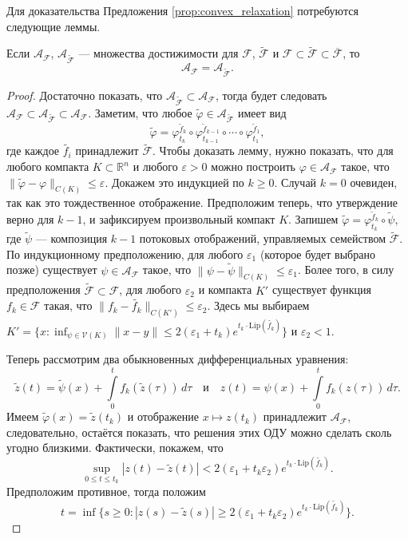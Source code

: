 \documentclass[../NDCNNAI_main.tex]{subfiles}
\begin{document}
Для доказательства Предложения \ref{prop:convex_relaxation} потребуются следующие леммы.

\begin{lemma}\label{lemma:3.12}
Если \(\mathcal{A}_{\mathcal{F}}\), \(\mathcal{A}_{\tilde{\mathcal{F}}}\) --- множества достижимости для \(\mathcal{F}\), \(\tilde{\mathcal{F}}\) и \(\mathcal{F} \subset \tilde{\mathcal{F}} \subset \overline{\mathcal{F}}\), то
\[
\mathcal{A}_{\mathcal{F}} = \mathcal{A}_{\tilde{\mathcal{F}}}.
\]
\end{lemma}

\begin{proof}
Достаточно показать, что \(\mathcal{A}_{\tilde{\mathcal{F}}} \subset \mathcal{A}_{\mathcal{F}}\), тогда будет следовать \(\mathcal{A}_{\mathcal{F}} \subset \mathcal{A}_{\tilde{\mathcal{F}}} \subset \mathcal{A}_{\mathcal{F}}\). Заметим, что любое \(\tilde{\varphi} \in \mathcal{A}_{\tilde{\mathcal{F}}}\) имеет вид
\[
\tilde{\varphi} = \varphi_{t_k}^{\tilde{f}_k} \circ \varphi_{t_{k-1}}^{\tilde{f}_{k-1}} \circ \cdots \circ \varphi_{t_1}^{\tilde{f}_1},
\]
где каждое \(\tilde{f_i}\) принадлежит \(\tilde{\mathcal{F}}\). Чтобы доказать лемму, нужно показать, что для любого компакта \(K \subset \mathbb{R}^n\) и любого \(\varepsilon > 0\) можно построить \(\varphi \in \mathcal{A}_{\mathcal{F}}\) такое, что \(\|\tilde{\varphi} - \varphi\|_{C(K)} \leq \varepsilon\). Докажем это индукцией по \(k \geq 0\). Случай \(k = 0\) очевиден, так как это тождественное отображение. Предположим теперь, что утверждение верно для \(k - 1\), и зафиксируем произвольный компакт \(K\). Запишем \(\tilde{\varphi} = \varphi_{t_k}^{\tilde{f}_k} \circ \tilde{\psi}\), где \(\tilde{\psi}\) --- композиция \(k - 1\) потоковых отображений, управляемых семейством \(\tilde{\mathcal{F}}\). По индукционному предположению, для любого \(\varepsilon_1\) (которое будет выбрано позже) существует \(\psi \in \mathcal{A}_{\mathcal{F}}\) такое, что \(\|\psi - \tilde{\psi}\|_{C(K)} \leq \varepsilon_1\). Более того, в силу предположения \(\tilde{\mathcal{F}} \subset \mathcal{F}\), для любого \(\varepsilon_2\) и компакта \(K'\) существует функция \(f_k \in \mathcal{F}\) такая, что \(\|f_k - \tilde{f_k}\|_{C(K')} \leq \varepsilon_2\). Здесь мы выбираем \(K' = \{x : \inf_{\psi \in \mathcal{V}(K)} \|x - y\| \leq 2(\varepsilon_1 + t_k)e^{t_k \cdot \mathrm{Lip}(\tilde{f_k})}\}\) и \(\varepsilon_2 < 1\).

Теперь рассмотрим два обыкновенных дифференциальных уравнения:
\[
\tilde{z}(t) = \tilde{\psi}(x) + \int\limits_0^t f_k(\tilde{z}(\tau)) \, d\tau \quad\text{и}\quad z(t) = \psi(x) + \int\limits_0^t f_k(z(\tau)) \, d\tau.
\]
Имеем \(\tilde{\varphi}(x) = \tilde{z}(t_k)\) и отображение \(x \mapsto z(t_k)\) принадлежит \(\mathcal{A}_{\mathcal{F}}\), следовательно, остаётся показать, что решения этих ОДУ можно сделать сколь угодно близкими. Фактически, покажем, что
\[
\sup_{0 \leq t \leq t_k} |z(t) - \tilde{z}(t)| < 2(\varepsilon_1 + t_k \varepsilon_2)e^{t_k \cdot \mathrm{Lip}(\tilde{f_k})}. \tag{$\ast$}
\]
Предположим противное, тогда положим
\[
t = \inf\{s \geq 0 : |z(s) - \tilde{z}(s)| \geq 2(\varepsilon_1 + t_k \varepsilon_2)e^{t_k \cdot \mathrm{Lip}(\tilde{f_k})}\}.
\]


\end{proof}
\end{document}
